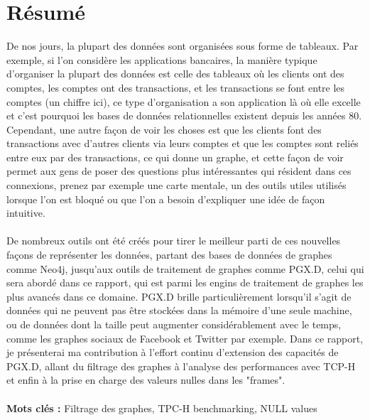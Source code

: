 

\chapter*{Résumé}
De nos jours, la plupart des données sont organisées sous forme de tableaux. Par exemple, si l'on considère les applications bancaires, la manière typique d'organiser la plupart des données est celle des tableaux où les clients ont des comptes, les comptes ont des transactions, et les transactions se font entre les comptes (un chiffre ici), ce type d'organisation a son application là où elle excelle et c'est pourquoi les bases de données relationnelles existent depuis les années 80. Cependant, une autre façon de voir les choses est que les clients font des transactions avec d'autres clients via leurs comptes et que les comptes sont reliés entre eux par des transactions, ce qui donne un graphe, et cette façon de voir permet aux gens de poser des questions plus intéressantes qui résident dans ces connexions, prenez par exemple une carte mentale, un des outils utiles utilisés lorsque l'on est bloqué ou que l'on a besoin d'expliquer une idée de façon intuitive. 
\\ \\
De nombreux outils ont été créés pour tirer le meilleur parti de ces nouvelles façons de représenter les données, partant des bases de données de graphes comme Neo4j, jusqu'aux outils de traitement de graphes comme PGX.D, celui qui sera abordé dans ce rapport, qui est parmi les engins de traitement de graphes les plus avancés dans ce domaine. PGX.D brille particulièrement lorsqu'il s'agit de données qui ne peuvent pas être stockées dans la mémoire d'une seule machine, ou de données dont la taille peut augmenter considérablement avec le temps, comme les graphes sociaux de Facebook et Twitter par exemple. Dans ce rapport, je présenterai ma contribution à l'effort continu d'extension des capacités de PGX.D, allant du filtrage des graphes à l'analyse des performances avec TCP-H et enfin à la prise en charge des valeurs nulles dans les "frames".
\\ \\

\noindent\textbf{Mots clés :} Filtrage des graphes, TPC-H benchmarking, NULL values

\newpage

